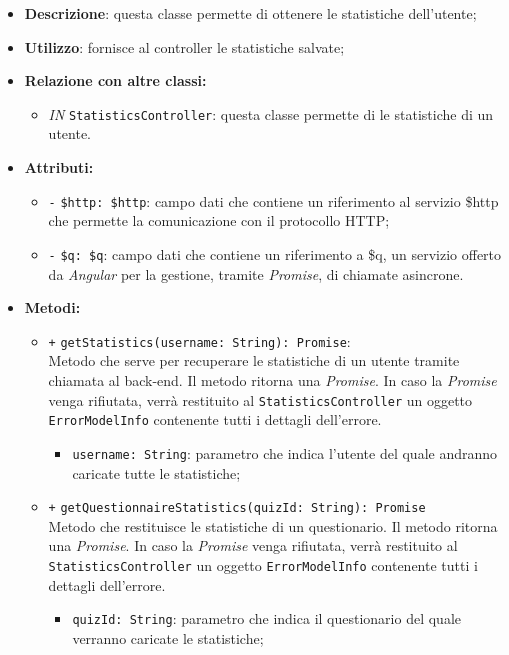 \begin{itemize}
	\item \textbf{Descrizione}: questa classe permette di ottenere le statistiche dell'utente;
	\item \textbf{Utilizzo}: fornisce al controller le statistiche salvate;
	\item \textbf{Relazione con altre classi:}
	\begin{itemize}
		\item \textit{IN} \texttt{StatisticsController}: questa classe permette di le statistiche di un utente.
	\end{itemize}
	\item \textbf{Attributi:}
	\begin{itemize}
		\item \texttt{-} \texttt{\$http: \$http}: campo dati che contiene un riferimento al servizio \$http che permette la comunicazione con il protocollo HTTP;
		\item \texttt{-} \texttt{\$q: \$q}: campo dati che contiene un riferimento a \$q, un servizio offerto da \textit{Angular} per la gestione, tramite \textit{Promise}, di chiamate asincrone.
	\end{itemize}
	\item \textbf{Metodi:}
	\begin{itemize}
		\item \texttt{+} \texttt{getStatistics(username: String): Promise}: \\Metodo che serve per recuperare le statistiche di un utente tramite chiamata al back-end. Il metodo ritorna una \textit{Promise}. In caso la \textit{Promise} venga rifiutata, verrà restituito al \texttt{StatisticsController} un oggetto \texttt{ErrorModelInfo} contenente tutti i dettagli dell'errore. \\
		\begin{itemize}
			\item \texttt{username: String}: parametro che indica l'utente del quale andranno caricate tutte le statistiche;
		\end{itemize}
		\item \texttt{+} \texttt{getQuestionnaireStatistics(quizId: String): Promise} \\Metodo che restituisce le statistiche di un questionario.  Il metodo ritorna una \textit{Promise}. In caso la \textit{Promise} venga rifiutata, verrà restituito al \texttt{StatisticsController} un oggetto \texttt{ErrorModelInfo} contenente tutti i dettagli dell'errore. \\
		\begin{itemize}
			\item \texttt{quizId: String}: parametro che indica il questionario del quale verranno caricate le statistiche;
		\end{itemize}
	\end{itemize}
\end{itemize}


